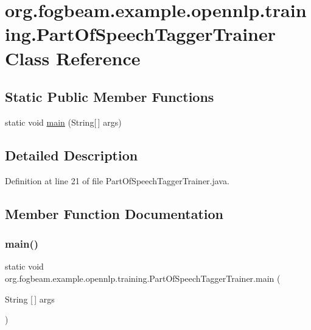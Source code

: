 \hypertarget{classorg_1_1fogbeam_1_1example_1_1opennlp_1_1training_1_1_part_of_speech_tagger_trainer}{}\section{org.\+fogbeam.\+example.\+opennlp.\+training.\+Part\+Of\+Speech\+Tagger\+Trainer Class Reference}
\label{classorg_1_1fogbeam_1_1example_1_1opennlp_1_1training_1_1_part_of_speech_tagger_trainer}
\subsection*{Static Public Member Functions}
\begin{DoxyCompactItemize}
\item 
static void \hyperlink{classorg_1_1fogbeam_1_1example_1_1opennlp_1_1training_1_1_part_of_speech_tagger_trainer_a7dbb23d74b570716df727c4b618ac083}{main} (String\mbox{[}$\,$\mbox{]} args)
\end{DoxyCompactItemize}


\subsection{Detailed Description}


Definition at line 21 of file Part\+Of\+Speech\+Tagger\+Trainer.\+java.



\subsection{Member Function Documentation}
\hypertarget{classorg_1_1fogbeam_1_1example_1_1opennlp_1_1training_1_1_part_of_speech_tagger_trainer_a7dbb23d74b570716df727c4b618ac083}{}\label{classorg_1_1fogbeam_1_1example_1_1opennlp_1_1training_1_1_part_of_speech_tagger_trainer_a7dbb23d74b570716df727c4b618ac083} 
\subsubsection{\texorpdfstring{main()}{main()}}
{\footnotesize\ttfamily static void org.\+fogbeam.\+example.\+opennlp.\+training.\+Part\+Of\+Speech\+Tagger\+Trainer.\+main (\begin{DoxyParamCaption}\item[{String \mbox{[}$\,$\mbox{]}}]{args }\end{DoxyParamCaption})\hspace{0.3cm}{\ttfamily [static]}}



